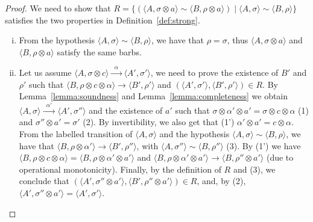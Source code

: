 \documentclass[main.tex]{subfiles}
\begin{document}
\begin{proof}%
	We need to show that $R = \{ (\langle A, \sigma \otimes a \rangle \sim \langle B, \rho \otimes a\rangle) \mid  \langle A, \sigma\rangle \sim \langle B, \rho\rangle\}$ satisfies the two properties in Definition~\ref{def:strong}.
	\begin{enumerate}[i)]
		\item From the hypothesis $\langle A, \sigma\rangle \sim \langle B, \rho\rangle$, we have that $\rho = \sigma$,
		thus $\langle A, \sigma \otimes a \rangle$ and $\langle B, \rho \otimes a\rangle$ satisfy the same barbs.
		
		\item Let us assume $\langle A, \sigma \otimes c \rangle  \xrightarrow{\; \; \alpha\;  \;} \langle A', \sigma'\rangle$,
		we need to prove the existence of $B'$ and $\rho'$ such that $\langle B, \rho \otimes c \otimes \alpha \rangle  \rightarrow \langle B', \rho'\rangle$ and $(\langle A', \sigma' \rangle, \langle B', \rho'\rangle) \in R$. %
		By Lemma~\ref{lemma:soundness} and Lemma~\ref{lemma:completeness} we obtain $\langle A, \sigma \rangle \xrightarrow{\; \; \alpha'\;  \;} \langle A', \sigma''\rangle$ and the existence of $a'$ such that $\sigma \otimes \alpha' \otimes a' = \sigma \otimes c \otimes \alpha$ (1) and $\sigma'' \otimes a' = \sigma'$ (2).
		By invertibility, we also get that (1') $\alpha' \otimes a' = c \otimes \alpha$.
		From the labelled transition of $\langle A, \sigma\rangle$ and the hypothesis $\langle A, \sigma \rangle \sim \langle B, \rho \rangle$, we have that $\langle B, \rho \otimes \alpha' \rangle \rightarrow \langle B', \rho''\rangle$, with $\langle A, \sigma''\rangle \sim \langle B, \rho''\rangle$ (3). By (1') we have $\langle B, \rho \otimes c \otimes \alpha \rangle = \langle B, \rho \otimes \alpha' \otimes
		a' \rangle$ and $\langle B, \rho \otimes \alpha' \otimes a' \rangle \rightarrow \langle  B, \rho'' \otimes a' \rangle$ (due to
		operational monotonicity). Finally, by the definition of $R$ and (3), we conclude that $(\langle A', \sigma'' \otimes a' \rangle, \langle B', \rho'' \otimes a'\rangle) \in R$, and, by (2), $\langle A', \sigma'' \otimes a' \rangle = \langle A', \sigma'\rangle$.
	\end{enumerate} 
\end{proof}
\end{document}
